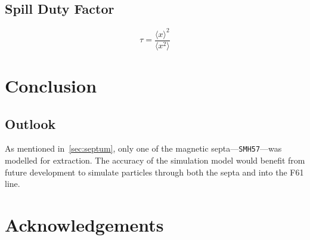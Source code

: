 \documentclass[11pt]{report}
\begin{document}

\section{Spill Duty Factor}


\begin{equation}
  \tau = \frac{\langle x\rangle^2}{\langle x^2\rangle}
\end{equation}

\chapter{Conclusion}

\section{Outlook}

As mentioned in~\autoref{sec:septum}, only one of the magnetic septa---\verb|SMH57|---was modelled for extraction. The accuracy of the simulation model would benefit from future development to simulate particles through both the septa and into the F61 line. 


\chapter{Acknowledgements}

 
 
\end{document}
